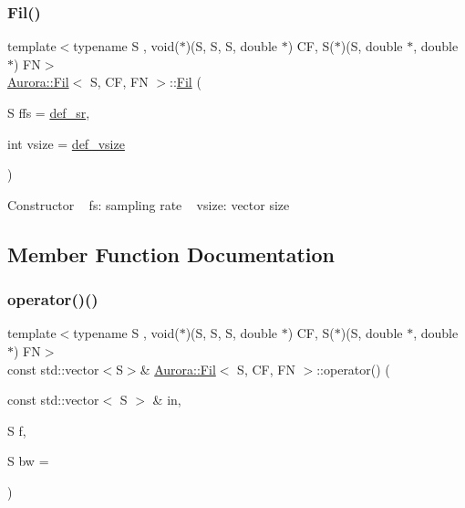 \subsubsection{\texorpdfstring{Fil()}{Fil()}}
{\footnotesize\ttfamily template$<$typename S , void($\ast$)(\+S, S, S, double $\ast$) CF, S($\ast$)(\+S, double $\ast$, double $\ast$) FN$>$ \\
\hyperlink{class_aurora_1_1_fil}{Aurora\+::\+Fil}$<$ S, CF, FN $>$\+::\hyperlink{class_aurora_1_1_fil}{Fil} (\begin{DoxyParamCaption}\item[{S}]{ffs = {\ttfamily \hyperlink{namespace_aurora_ad49263d809bea98dd422e95bc91bc03e}{def\+\_\+sr}},  }\item[{int}]{vsize = {\ttfamily \hyperlink{namespace_aurora_afaaddf667a06e7ce23c667a8b7295263}{def\+\_\+vsize}} }\end{DoxyParamCaption})\hspace{0.3cm}{\ttfamily [inline]}}

Constructor ~\newline
fs\+: sampling rate ~\newline
vsize\+: vector size 

\subsection{Member Function Documentation}
\mbox{\label{class_aurora_1_1_fil_a62f4f94aaf2eccf547cc78904dd0c118}} 
\subsubsection{\texorpdfstring{operator()()}{operator()()}\hspace{0.1cm}{\footnotesize\ttfamily [1/2]}}
{\footnotesize\ttfamily template$<$typename S , void($\ast$)(\+S, S, S, double $\ast$) CF, S($\ast$)(\+S, double $\ast$, double $\ast$) FN$>$ \\
const std\+::vector$<$S$>$\& \hyperlink{class_aurora_1_1_fil}{Aurora\+::\+Fil}$<$ S, CF, FN $>$\+::operator() (\begin{DoxyParamCaption}\item[{const std\+::vector$<$ S $>$ \&}]{in,  }\item[{S}]{f,  }\item[{S}]{bw = {} }\end{DoxyParamCaption})\hspace{0.3cm}{\ttfamily [inline]}}

